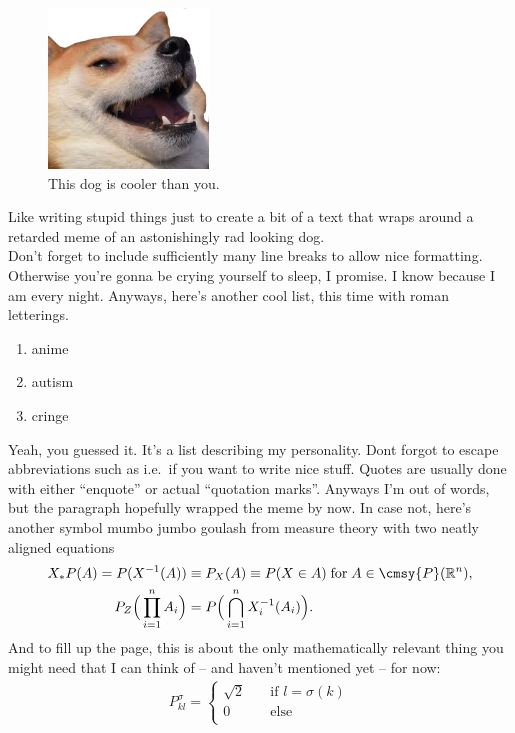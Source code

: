 \begin{figure}
		\centering
		\includegraphics[width=0.38\textwidth]{images/rad_doge.png}
		\caption{This dog is cooler than you.}
		\vspace{-1.5cm} %
		\label{fig_dog}
\end{figure} 
\noindent Like writing stupid things just to create a bit of a text that wraps around 
a retarded meme of an astonishingly rad looking dog. \\
Don't forget to include sufficiently many line breaks to allow nice formatting. 
Otherwise you're gonna be crying yourself to sleep, I promise. 
I know because I am every night. Anyways, here's another cool list, this time with roman letterings. 
\begin{enumerate}[label=(\roman*)]
	\item \textcolor{colordgray}{anime}
	\item \colorbox{colororange}{autism}
	\item \textcolor{colorgreen}{cringe}
\end{enumerate} 
Yeah, you guessed it. It's a list describing my personality. Dont forgot to escape abbreviations such 
as i.e.\ if you want to write nice stuff. Quotes are usually done with either \enquote{enquote} 
or actual ``quotation marks''. Anyways I'm out of words, but the paragraph hopefully 
wrapped the meme by now. In case not, here's another symbol mumbo jumbo goulash from 
measure theory with two neatly aligned equations
\begin{align*}
	X_{\ast} P (A) 
	= P(X^{-1}(A)) 
	&\equiv P_X(A) \equiv P(X \in A)  
	\; \mathrm{for} \; A \in \cmsy{P}(\mathbb{R}^n), \\
	P_Z \Big( \prod_{i=1}^{n} A_i \Big) 
	&= P \Big( 
		\bigcap\limits_{i=1}^n X_i^{-1}(A_i) 
		\Big).
\end{align*}
And to fill up the page, this is about the only mathematically relevant thing you might 
need that I can think of -- and haven't mentioned yet -- for now:
\begin{align*}
	P^{\sigma}_{kl} = 
	\begin{cases}
	\sqrt{2} &\quad \text{if } l = \sigma(k)\\
	0 &\quad \text{else}  \\
	\end{cases}
\end{align*} 
